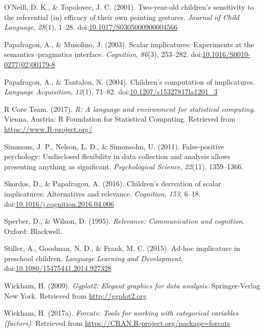 \documentclass[man]{apa6}
\theoremstyle{definition}
\theoremstyle{definition}
\theoremstyle{definition}
\theoremstyle{remark}
\begin{document}
\hypertarget{ref-oneill2001}{}
O'Neill, D. K., \& Topolovec, J. C. (2001). Two-year-old children's
sensitivity to the referential (in) efficacy of their own pointing
gestures. \emph{Journal of Child Language}, \emph{28}(1), 1--28.
doi:\href{https://doi.org/10.1017/S0305000900004566}{10.1017/S0305000900004566}

\hypertarget{ref-papafragou2003}{}
Papafragou, A., \& Musolino, J. (2003). Scalar implicatures: Experiments
at the semantics--pragmatics interface. \emph{Cognition}, \emph{86}(3),
253--282.
doi:\href{https://doi.org/10.1016/S0010-0277(02)00179-8}{10.1016/S0010-0277(02)00179-8}

\hypertarget{ref-papafragou2004}{}
Papafragou, A., \& Tantalou, N. (2004). Children's computation of
implicatures. \emph{Language Acquisition}, \emph{12}(1), 71--82.
doi:\href{https://doi.org/10.1207/s15327817la1201_3}{10.1207/s15327817la1201\_3}

\hypertarget{ref-R-base}{}
R Core Team. (2017). \emph{R: A language and environment for statistical
computing}. Vienna, Austria: R Foundation for Statistical Computing.
Retrieved from \url{https://www.R-project.org/}

\hypertarget{ref-simmons2011false}{}
Simmons, J. P., Nelson, L. D., \& Simonsohn, U. (2011). False-positive
psychology: Undisclosed flexibility in data collection and analysis
allows presenting anything as significant. \emph{Psychological Science},
\emph{22}(11), 1359--1366.

\hypertarget{ref-skordos2016}{}
Skordos, D., \& Papafragou, A. (2016). Children's derivation of scalar
implicatures: Alternatives and relevance. \emph{Cognition}, \emph{153},
6--18.
doi:\href{https://doi.org/10.1016/j.cognition.2016.04.006}{10.1016/j.cognition.2016.04.006}

\hypertarget{ref-sperber1986}{}
Sperber, D., \& Wilson, D. (1995). \emph{Relevance: Communication and
cognition}. Oxford: Blackwell.

\hypertarget{ref-stiller2015}{}
Stiller, A., Goodman, N. D., \& Frank, M. C. (2015). Ad-hoc implicature
in preschool children. \emph{Language Learning and Development}.
doi:\href{https://doi.org/10.1080/15475441.2014.927328}{10.1080/15475441.2014.927328}

\hypertarget{ref-R-ggplot2}{}
Wickham, H. (2009). \emph{Ggplot2: Elegant graphics for data analysis}.
Springer-Verlag New York. Retrieved from \url{http://ggplot2.org}

\hypertarget{ref-R-forcats}{}
Wickham, H. (2017a). \emph{Forcats: Tools for working with categorical
variables (factors)}. Retrieved from
\url{https://CRAN.R-project.org/package=forcats}
\end{document}
